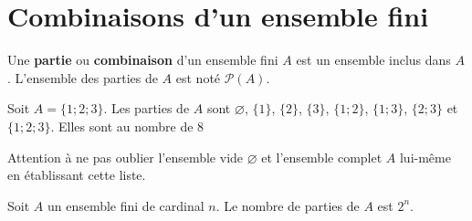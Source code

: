 \documentclass[11pt,fleqn, openany]{book} %
\begin{document}
 \section{Combinaisons d'un ensemble fini}
 
 \begin{definition} Une \textbf{partie} ou \textbf{combinaison} d'un ensemble fini $A$ est un ensemble inclus dans $A$. L'ensemble des parties de $A$ est noté $\mathcal{P}(A)$.\end{definition}


\begin{example} Soit $A=\{1;2;3\}$. Les parties de $A$ sont $\varnothing$, $\{1\}$, $\{2\}$, $\{3\}$, $\{1;2\}$, $\{1;3\}$, $\{2;3\}$ et $\{1;2;3\}$. Elles sont au nombre de $8$

Attention à ne pas oublier l'ensemble vide $\varnothing$ et l'ensemble complet $A$ lui-même en établissant cette liste.\end{example} 
 
 \begin{proposition}
Soit $A$ un ensemble fini de cardinal $n$. Le nombre de parties de $A$ est $2^n$.\end{proposition}
 
\end{document}
